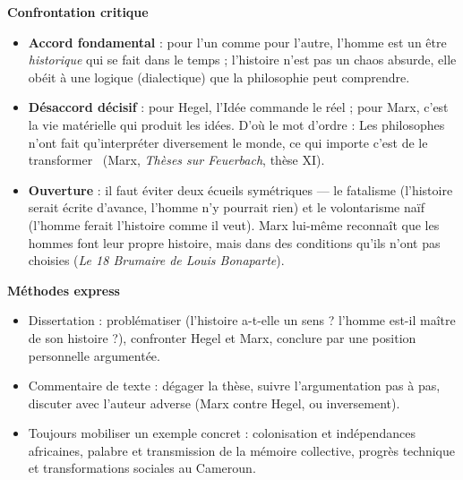 \documentclass[11pt]{article}
\begin{document}
\begin{aretenir}
\textbf{Confrontation critique}
\begin{itemize}
  \item \textbf{Accord fondamental} : pour l'un comme pour l'autre, l'homme est un être \emph{historique} qui se fait dans le temps ; l'histoire n'est pas un chaos absurde, elle obéit à une logique (dialectique) que la philosophie peut comprendre.
  \item \textbf{Désaccord décisif} : pour Hegel, l'Idée commande le réel ; pour Marx, c'est la vie matérielle qui produit les idées. D'où le mot d'ordre : \guillemotleft Les philosophes n'ont fait qu'interpréter diversement le monde, ce qui importe c'est de le transformer \guillemotright\ (Marx, \emph{Thèses sur Feuerbach}, thèse XI).
  \item \textbf{Ouverture} : il faut éviter deux écueils symétriques --- le fatalisme (l'histoire serait écrite d'avance, l'homme n'y pourrait rien) et le volontarisme naïf (l'homme ferait l'histoire comme il veut). Marx lui-même reconnaît que les hommes font leur propre histoire, mais dans des conditions qu'ils n'ont pas choisies (\emph{Le 18 Brumaire de Louis Bonaparte}).
\end{itemize}

\textbf{Méthodes express}
\begin{itemize}
  \item Dissertation : problématiser (l'histoire a-t-elle un sens ? l'homme est-il maître de son histoire ?), confronter Hegel et Marx, conclure par une position personnelle argumentée.
  \item Commentaire de texte : dégager la thèse, suivre l'argumentation pas à pas, discuter avec l'auteur adverse (Marx contre Hegel, ou inversement).
  \item Toujours mobiliser un exemple concret : colonisation et indépendances africaines, palabre et transmission de la mémoire collective, progrès technique et transformations sociales au Cameroun.
\end{itemize}
\end{aretenir}
\end{document}

